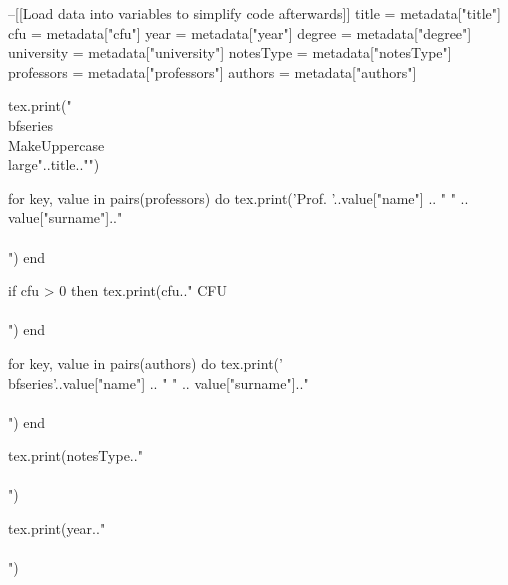 \hypersetup{pageanchor=false}
\ifLuaTeX
\begin{luacode}
--[[Load data into variables to simplify code afterwards]]
title = metadata["title"]
cfu = metadata["cfu"]
year = metadata["year"]
degree = metadata["degree"]
university = metadata["university"]
notesType = metadata["notesType"]
professors = metadata["professors"]
authors = metadata["authors"]
\end{luacode}


\begin{titlepage}
\begin{center}
\vspace*{1em}
\begin{luacode}
		tex.print("\\bfseries{\\MakeUppercase{\\large{"..title.."}}}")
\end{luacode}

\vspace{1em}

\begin{luacode}
		for key, value in pairs(professors) do
			 tex.print('Prof. '..value["name"] .. " " .. value["surname"].."\\\\")
		end
\end{luacode}
\begin{luacode}
	if cfu > 0 then
		tex.print(cfu.." CFU\\\\")
	end
\end{luacode}

\vspace{1em}

\begin{luacode}
		for key, value in pairs(authors) do
			 tex.print('\\bfseries{'..value["name"] .. " " .. value["surname"].."}\\\\")
		end
\end{luacode}

\vfill

\begin{luacode}
		tex.print(notesType.."\\\\")
\end{luacode}
\begin{luacode}
		tex.print(year.."\\\\")
\end{luacode}


\end{center}
\end{titlepage}
